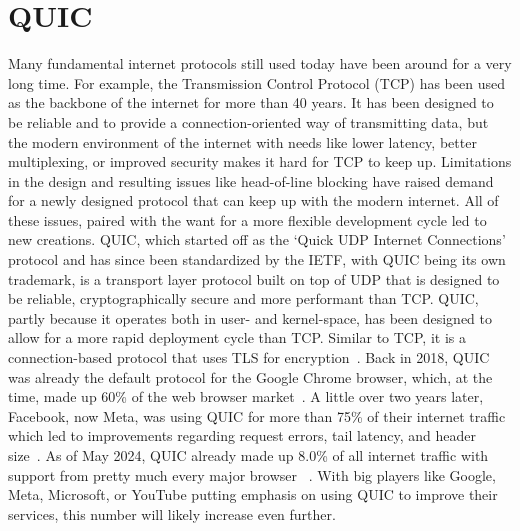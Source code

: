 \section{QUIC}\label{sec:quic_bg}
Many fundamental internet protocols still used today have been around for 
a very long time.
For example, the Transmission Control Protocol (TCP) has been used as the backbone
of the internet for more than 40 years.
It has been designed to be reliable and to provide a connection-oriented
way of transmitting data, but the modern environment of the internet with
needs like lower latency, better multiplexing, or improved security makes it 
hard for TCP to keep up.
Limitations in the design and resulting issues like head-of-line blocking
have raised demand for a newly designed protocol that can keep up with the
modern internet. %
All of these issues, paired with the want for a more flexible development cycle
led to new creations.
QUIC, which started off as the `Quick UDP Internet Connections' protocol and has 
since been standardized by the IETF, with QUIC being its own trademark, is a 
transport layer protocol built on top of UDP that is designed to be reliable, 
cryptographically secure and more performant than TCP\@.
QUIC, partly because it operates both in user- and kernel-space, has been designed to allow for a 
more rapid deployment cycle than TCP\@.
Similar to TCP, it is a connection-based protocol that uses TLS for encryption~\parencite{quic-explained}.
Back in 2018, QUIC was already the default protocol for the Google Chrome browser, which,
at the time, made up 60\% of the web browser market~\parencite{google-quic-usage}.
A little over two years later, Facebook, now Meta, was using QUIC for more than 75\% of 
their internet traffic which led to improvements regarding
request errors, tail latency, and header size~\parencite{facebook-quic-usage}.
As of May 2024, QUIC already made up 8.0\% of all internet traffic %
with support from pretty much every major browser
~\parencite{internet-quic-usage, article-quic-usage}.
With big players like Google, Meta, Microsoft, or YouTube putting emphasis on
using QUIC to improve their services, this number will likely increase even further.

